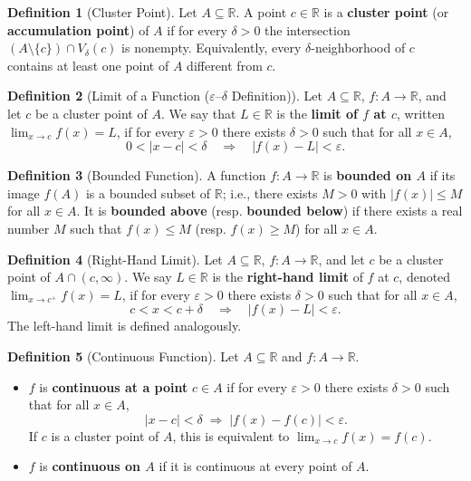 \documentclass[12pt,a4paper]{article}
\theoremstyle{definition}
\newtheorem*{definition}{Definition}
\newcommand{\R}{\mathbb{R}}
\newcommand{\eps}{\varepsilon}
\newcommand{\abs}[1]{\left\lvert#1\right\rvert}
\begin{document}
\begin{definition}[Cluster Point]
Let \(A\subseteq\R\). A point \(c\in\R\) is a \textbf{cluster point} (or \textbf{accumulation point}) of \(A\) if for every \(\delta>0\) the intersection \((A\setminus\{c\})\cap V_\delta(c)\) is nonempty. Equivalently, every \(\delta\)-neighborhood of \(c\) contains at least one point of \(A\) different from \(c\).
\end{definition}

\begin{definition}[Limit of a Function ($\varepsilon$--$\delta$ Definition)]
Let \(A\subseteq\R\), \(f:A\to\R\), and let \(c\) be a cluster point of \(A\). We say that \(L\in\R\) is the \textbf{limit of \(f\) at \(c\)}, written \(\lim_{x\to c} f(x)=L\), if for every \(\eps>0\) there exists \(\delta>0\) such that for all \(x\in A\),
\[
0 < \abs{x-c} < \delta \quad\Longrightarrow\quad \abs{f(x)-L} < \eps.
\]
\end{definition}

\begin{definition}[Bounded Function]
A function \(f:A\to\R\) is \textbf{bounded on \(A\)} if its image \(f(A)\) is a bounded subset of \(\R\); i.e., there exists \(M>0\) with \(\abs{f(x)}\le M\) for all \(x\in A\). It is \textbf{bounded above} (resp. \textbf{bounded below}) if there exists a real number \(M\) such that \(f(x)\le M\) (resp. \(f(x)\ge M\)) for all \(x\in A\).
\end{definition}

\begin{definition}[Right-Hand Limit]
Let \(A\subseteq\R\), \(f:A\to\R\), and let \(c\) be a cluster point of \(A\cap(c,\infty)\). We say \(L\in\R\) is the \textbf{right-hand limit} of \(f\) at \(c\), denoted \(\lim_{x\to c^+} f(x)=L\), if for every \(\eps>0\) there exists \(\delta>0\) such that for all \(x\in A\),
\[
c < x < c+\delta \quad\Longrightarrow\quad \abs{f(x)-L} < \eps.
\]
The left-hand limit is defined analogously.
\end{definition}

\begin{definition}[Continuous Function]
Let \(A\subseteq\R\) and \(f:A\to\R\).
\begin{itemize}
    \item \(f\) is \textbf{continuous at a point} \(c\in A\) if for every \(\eps>0\) there exists \(\delta>0\) such that for all \(x\in A\),
    \[
    \abs{x-c}<\delta \;\Longrightarrow\; \abs{f(x)-f(c)}<\eps.
    \]
    If \(c\) is a cluster point of \(A\), this is equivalent to \(\lim_{x\to c}f(x)=f(c)\).
    \item \(f\) is \textbf{continuous on \(A\)} if it is continuous at every point of \(A\).
\end{itemize}
\end{definition}
\end{document}
